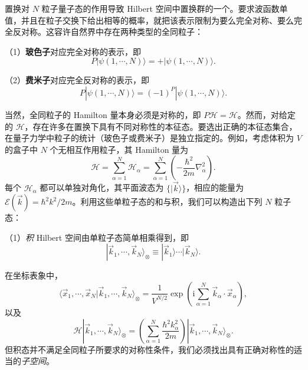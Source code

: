置换对 $N$ 粒子量子态的作用导致 Hilbert 空间中置换群的一个。要求波函数单值，并且在粒子交换下给出相等的概率，就把该表示限制为要么完全对称、要么完全反对称。这容许自然界中存在两种类型的全同粒子：

（1）\textbf{玻色子}对应完全对称的表示，即
\begin{equation*}
P|\psi(1,\cdots,N)\rangle=+|\psi(1,\cdots,N)\rangle.
\end{equation*}

（2）\textbf{费米子}对应完全反对称的表示，即
\begin{equation*}
P|\psi(1,\cdots,N)\rangle=(-1)^P|\psi(1,\cdots,N)\rangle.
\end{equation*}

当然，全同粒子的 Hamilton 量本身必须是对称的，即 $P\mathscr H=\mathscr H$。然而，对给定的 $\mathscr H$，存在许多在置换下具有不同对称性的本征态。要选出正确的本征态集合，在量子力学中粒子的统计（玻色子或费米子）是独立指定的。例如，考虑体积为 $V$ 的盒子中 $N$ 个无相互作用粒子，其 Hamilton 量为
\begin{equation}\label{eq:7.2}
\mathscr H=\sum_{\alpha=1}^N\mathscr H_\alpha=\sum_{\alpha=1}^N\left(-\frac{\hbar^2}{2m}\nabla_\alpha^2\right).
\end{equation}
每个 $\mathscr H_\alpha$ 都可以单独对角化，其平面波态为 $\{|\vec k\rangle\}$，相应的能量为 $\mathcal E(\vec k)=\hbar^2k^2/2m$。利用这些单粒子态的和与积，我们可以构造出下列 $N$ 粒子态：

（1）\emph{积} Hilbert 空间由单粒子态简单相乘得到，即
\begin{equation}\label{eq:7.3}
|\vec k_1,\cdots,\vec k_N\rangle_\otimes\equiv|\vec k_1\rangle\cdots|\vec k_N\rangle.
\end{equation}


在坐标表象中，
\begin{equation}\label{eq:7.4}
\langle\vec x_1,\cdots,\vec x_N|\vec k_1,\cdots,\vec k_N\rangle_\otimes=\frac1{V^{N/2}}\exp\left(\mathrm i\sum_{\alpha=1}^N\vec k_\alpha\cdot\vec x_\alpha\right),
\end{equation}
以及
\begin{equation}\label{eq:7.5}
\mathscr H|\vec k_1,\cdots,\vec k_N\rangle_\otimes=\left(\sum_{\alpha=1}^N\frac{\hbar^2k_\alpha^2}{2m}\right)|\vec k_1,\cdots,\vec k_N\rangle_\otimes.
\end{equation}
但积态并不满足全同粒子所要求的对称性条件，我们必须找出具有正确对称性的适当的\emph{子空间}。

